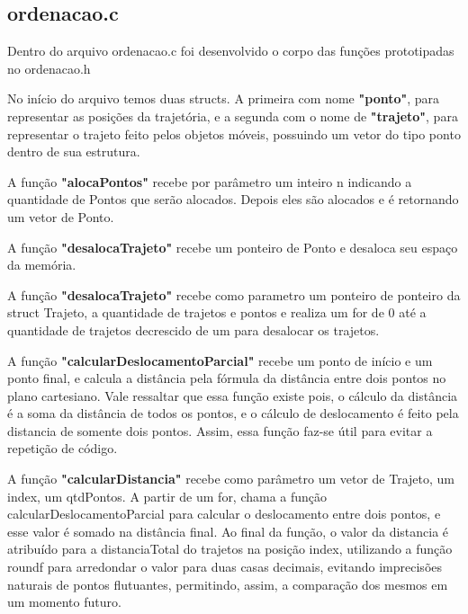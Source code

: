 \documentclass{article}
\begin{document}
\subsection{ordenacao.c}

    Dentro do arquivo ordenacao.c foi desenvolvido o corpo das funções prototipadas no ordenacao.h 
    \par No início do arquivo temos duas structs. A primeira com nome \textbf{"ponto"}, para representar as posições da trajetória, e a segunda com o nome de \textbf{"trajeto"}, para representar o trajeto feito pelos objetos móveis, possuindo um vetor do tipo ponto dentro de sua estrutura.
    
    \par A função \textbf{"alocaPontos"} recebe por parâmetro um inteiro n indicando a quantidade de Pontos que serão alocados. Depois eles são alocados e é retornando um vetor de Ponto.

    \par A função \textbf{"desalocaTrajeto"} recebe um ponteiro de Ponto e desaloca seu espaço da memória.

    \par A função \textbf{"desalocaTrajeto"} recebe como parametro um ponteiro de ponteiro da struct Trajeto, a quantidade de trajetos e pontos e realiza um for de 0 até a quantidade de trajetos decrescido de um para desalocar os trajetos.

    \par A função \textbf{"calcularDeslocamentoParcial"} recebe um ponto de início e um ponto final, e calcula a distância pela fórmula da distância entre dois pontos no plano cartesiano. Vale ressaltar que essa função existe pois, o cálculo da distância é a soma da distância de todos os pontos, e o cálculo de deslocamento é feito pela distancia de somente dois pontos. Assim, essa função faz-se útil para evitar a repetição de código.

    \par A função \textbf{"calcularDistancia"} recebe como parâmetro um vetor de Trajeto, um index, um qtdPontos. A partir de um for, chama a função calcularDeslocamentoParcial para calcular o deslocamento entre dois pontos, e esse valor é somado na distância final. Ao final da função, o valor da distancia é atribuído para a distanciaTotal do trajetos na posição index, utilizando a função roundf para arredondar o valor para duas casas decimais, evitando imprecisões naturais de pontos flutuantes, permitindo, assim, a comparação dos mesmos em um momento futuro.
\end{document}
